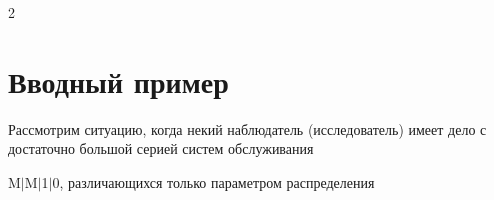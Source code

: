\begin{multicols}{2}


















































\section{Вводный пример}








Рассмотрим ситуацию, когда некий наблюдатель (исследователь) имеет дело с достаточно большой серией систем обслуживания


M$\vert$M$\vert$1$\vert$0, различающихся только параметром распределения %



\end{multicols}
